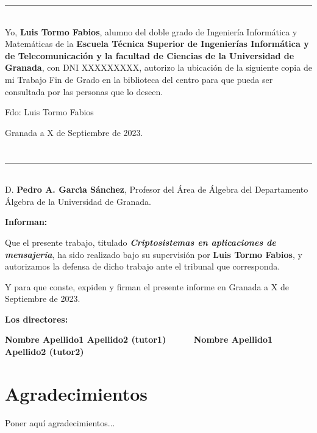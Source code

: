 \noindent\rule[-1ex]{\textwidth}{2pt}\\[4.5ex]

Yo, \textbf{Luis Tormo Fabios}, alumno del doble grado de Ingeniería Informática y Matemáticas de la \textbf{Escuela Técnica Superior
de Ingenierías Informática y de Telecomunicación y la facultad de Ciencias de la Universidad de Granada}, con DNI XXXXXXXXX, autorizo la
ubicación de la siguiente copia de mi Trabajo Fin de Grado en la biblioteca del centro para que pueda ser
consultada por las personas que lo deseen.

\vspace{6cm}

\noindent Fdo: Luis Tormo Fabios

\vspace{2cm}

\begin{flushright}
Granada a X de Septiembre de 2023.
\end{flushright}


\chapter*{}
\thispagestyle{empty}

\noindent\rule[-1ex]{\textwidth}{2pt}\\[4.5ex]

D. \textbf{Pedro A. Garcı́a Sánchez}, Profesor del Área de Álgebra del Departamento Álgebra de la Universidad de Granada.

\vspace{0.5cm}

\textbf{Informan:}

\vspace{0.5cm}

Que el presente trabajo, titulado \textit{\textbf{Criptosistemas en aplicaciones de mensajería}},
ha sido realizado bajo su supervisión por \textbf{Luis Tormo Fabios}, y autorizamos la defensa de dicho trabajo ante el tribunal
que corresponda.

\vspace{0.5cm}

Y para que conste, expiden y firman el presente informe en Granada a X de Septiembre de 2023.

\vspace{1cm}

\textbf{Los directores:}

\vspace{5cm}

\noindent \textbf{Nombre Apellido1 Apellido2 (tutor1) \ \ \ \ \ Nombre Apellido1 Apellido2 (tutor2)}

\chapter*{Agradecimientos}
\thispagestyle{empty}

       \vspace{1cm}


Poner aquí agradecimientos...

